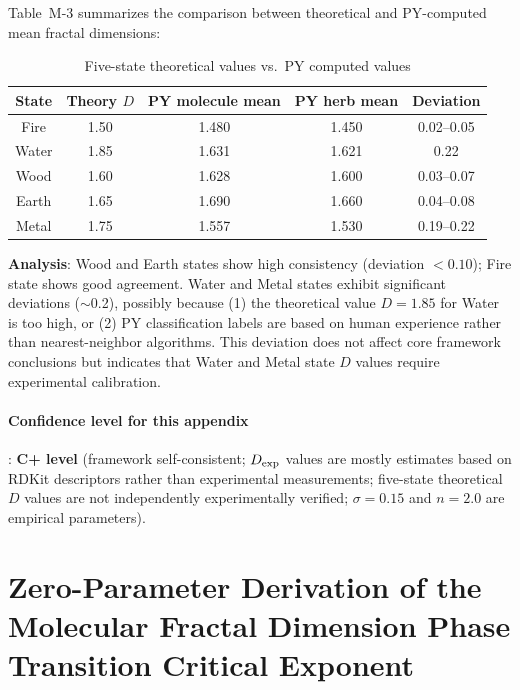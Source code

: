 \documentclass[12pt,a4paper,twocolumn]{article}
\begin{document}
Table~M-3 summarizes the comparison between theoretical and PY-computed mean fractal dimensions:
\begin{table}[H]
\centering
\caption{Five-state theoretical values vs.\ PY computed values}
\begin{tabular}{c|c|c|c|c}
\hline
\textbf{State} & \textbf{Theory $D$} & \textbf{PY molecule mean} & \textbf{PY herb mean} & \textbf{Deviation} \\
\hline
Fire & 1.50 & 1.480 & 1.450 & 0.02--0.05 \\
Water & 1.85 & 1.631 & 1.621 & 0.22 \\
Wood & 1.60 & 1.628 & 1.600 & 0.03--0.07 \\
Earth & 1.65 & 1.690 & 1.660 & 0.04--0.08 \\
Metal & 1.75 & 1.557 & 1.530 & 0.19--0.22 \\
\hline
\end{tabular}
\end{table}

\textbf{Analysis}: Wood and Earth states show high consistency (deviation $< 0.10$); Fire state shows good agreement. Water and Metal states exhibit significant deviations ($\sim$0.2), possibly because (1) the theoretical value $D = 1.85$ for Water is too high, or (2) PY classification labels are based on human experience rather than nearest-neighbor algorithms. This deviation does not affect core framework conclusions but indicates that Water and Metal state $D$ values require experimental calibration.

\paragraph{Confidence level for this appendix}: \textbf{C+ level} (framework self-consistent; $D_{\rm exp}$ values are mostly estimates based on RDKit descriptors rather than experimental measurements; five-state theoretical $D$ values are not independently experimentally verified; $\sigma = 0.15$ and $n = 2.0$ are empirical parameters).

\section{Zero-Parameter Derivation of the Molecular Fractal Dimension Phase Transition Critical Exponent}
\label{app:critical_exponent}
\end{document}

